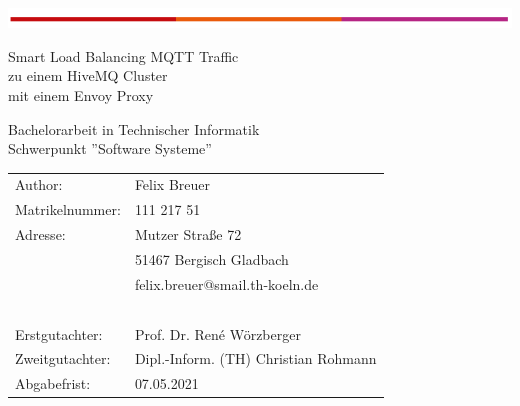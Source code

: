 \begin{titlepage}
\begin{flushleft}
	\vspace*{-1cm}
	\includegraphics[scale=1]{images/th-bar.png}\\
	\vspace*{1cm}
\end{flushleft}
\begin{center}
\begin{huge}
Smart Load Balancing MQTT Traffic\\
zu einem HiveMQ Cluster\\
mit einem Envoy Proxy\\
\end{huge}
\vspace{2cm}
Bachelorarbeit in Technischer Informatik\\
Schwerpunkt ''Software Systeme''
\end{center}
\vspace{4cm}
\noindent\begin{tabular}{p{5cm}l}
	Author: & Felix Breuer \\
	Matrikelnummer: &	111 217 51 \\
	Adresse: & Mutzer Stra{\ss}e 72 \\
	~ &	51467 Bergisch Gladbach \\
	~ &	felix.breuer@smail.th-koeln.de \\
	~ & ~ \\
	Erstgutachter: & Prof. Dr. René Wörzberger \\
	Zweitgutachter: & Dipl.-Inform. (TH) Christian Rohmann \\
	Abgabefrist: & 07.05.2021 \\
\end{tabular}
~\\
~\\
~\\
~\\
~\\
~\\
\end{titlepage}
\newpage
